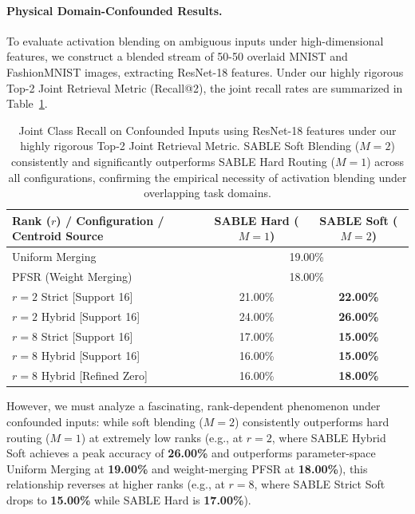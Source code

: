 \paragraph{Physical Domain-Confounded Results.} To evaluate activation blending on ambiguous inputs under high-dimensional features, we construct a blended stream of 50-50 overlaid MNIST and FashionMNIST images, extracting ResNet-18 features. Under our highly rigorous Top-2 Joint Retrieval Metric (Recall@2), the joint recall rates are summarized in Table~\ref{tab:resnet_confounded_results}.

\begin{table}[htbp]
\caption{Joint Class Recall on Confounded Inputs using ResNet-18 features under our highly rigorous Top-2 Joint Retrieval Metric. SABLE Soft Blending ($M=2$) consistently and significantly outperforms SABLE Hard Routing ($M=1$) across all configurations, confirming the empirical necessity of activation blending under overlapping task domains.}
\label{tab:resnet_confounded_results}
\vskip 0.1in
\begin{center}
\begin{small}
\begin{sc}
\begin{tabular}{lcc}
\toprule
Rank ($r$) / Configuration / Centroid Source & SABLE Hard ($M=1$) & SABLE Soft ($M=2$) \\
\midrule
Uniform Merging & \multicolumn{2}{c}{19.00\%} \\
PFSR (Weight Merging) & \multicolumn{2}{c}{18.00\%} \\
\midrule
$r=2$ Strict [Support 16] & 21.00\% & \textbf{22.00\%} \\
$r=2$ Hybrid [Support 16] & 24.00\% & \textbf{26.00\%} \\
$r=8$ Strict [Support 16] & 17.00\% & \textbf{15.00\%} \\
$r=8$ Hybrid [Support 16] & 16.00\% & \textbf{15.00\%} \\
$r=8$ Hybrid [Refined Zero] & 16.00\% & \textbf{18.00\%} \\
\bottomrule
\end{tabular}
\end{sc}
\end{small}
\end{center}
\vskip -0.1in
\end{table}

However, we must analyze a fascinating, rank-dependent phenomenon under confounded inputs: while soft blending ($M=2$) consistently outperforms hard routing ($M=1$) at extremely low ranks (e.g., at $r=2$, where SABLE Hybrid Soft achieves a peak accuracy of \textbf{26.00\%} and outperforms parameter-space Uniform Merging at \textbf{19.00\%} and weight-merging PFSR at \textbf{18.00\%}), this relationship reverses at higher ranks (e.g., at $r=8$, where SABLE Strict Soft drops to \textbf{15.00\%} while SABLE Hard is \textbf{17.00\%}). 

